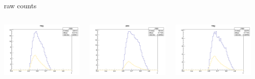 \begin{frame}{raw counts}
\begin{columns}
\begin{column}[T]{0.25\textwidth}
\includegraphics[width = \textwidth]{results/yield/statistics/yield_x_Q2_z_0.35_4.000_0.60_neg.png}
\end{column}
\begin{column}[T]{0.25\textwidth}
\includegraphics[width = \textwidth]{results/yield/statistics/yield_x_Q2_z_0.35_4.000_0.70_pos.png}
\end{column}
\begin{column}[T]{0.25\textwidth}
\includegraphics[width = \textwidth]{results/yield/statistics/yield_x_Q2_z_0.35_4.000_0.70_neg.png}
\end{column}
\end{columns}
\end{frame}
